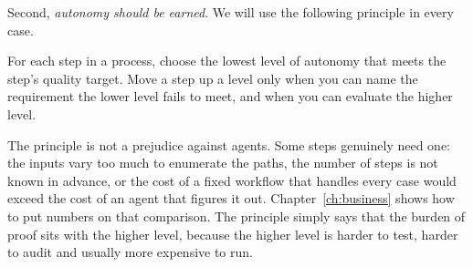 Second, \emph{autonomy should be earned}. We will use the following principle in every case.

\begin{principle}
For each step in a process, choose the lowest level of autonomy that meets the step's quality target. Move a step up a level only when you can name the requirement the lower level fails to meet, and when you can evaluate the higher level.
\end{principle}

The principle is not a prejudice against agents. Some steps genuinely need one: the inputs vary too much to enumerate the paths, the number of steps is not known in advance, or the cost of a fixed workflow that handles every case would exceed the cost of an agent that figures it out. Chapter~\ref{ch:business} shows how to put numbers on that comparison. The principle simply says that the burden of proof sits with the higher level, because the higher level is harder to test, harder to audit and usually more expensive to run.
